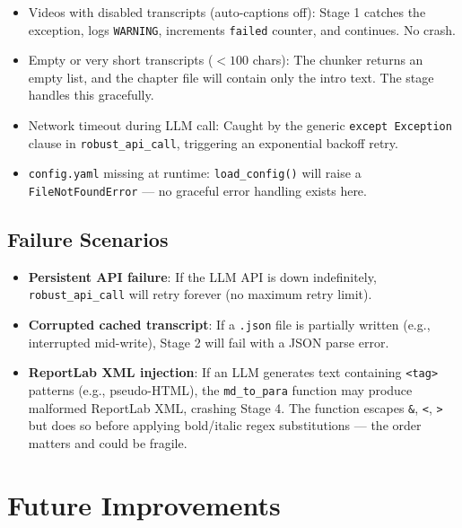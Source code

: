 \documentclass[11pt,a4paper]{article}
\begin{document}
\begin{itemize}[leftmargin=1.5em]
    \item Videos with disabled transcripts (auto-captions off): Stage 1 catches the exception, logs \texttt{WARNING}, increments \texttt{failed} counter, and continues. No crash.
    \item Empty or very short transcripts ($< 100$ chars): The chunker returns an empty list, and the chapter file will contain only the intro text. The stage handles this gracefully.
    \item Network timeout during LLM call: Caught by the generic \texttt{except Exception} clause in \texttt{robust\_api\_call}, triggering an exponential backoff retry.
    \item \texttt{config.yaml} missing at runtime: \texttt{load\_config()} will raise a \texttt{FileNotFoundError} --- no graceful error handling exists here.
\end{itemize}

\subsection{Failure Scenarios}

\begin{itemize}[leftmargin=1.5em]
    \item \textbf{Persistent API failure}: If the LLM API is down indefinitely, \texttt{robust\_api\_call} will retry forever (no maximum retry limit).
    \item \textbf{Corrupted cached transcript}: If a \texttt{.json} file is partially written (e.g., interrupted mid-write), Stage 2 will fail with a JSON parse error.
    \item \textbf{ReportLab XML injection}: If an LLM generates text containing \texttt{<tag>} patterns (e.g., pseudo-HTML), the \texttt{md\_to\_para} function may produce malformed ReportLab XML, crashing Stage 4. The function escapes \texttt{\&}, \texttt{<}, \texttt{>} but does so before applying bold/italic regex substitutions --- the order matters and could be fragile.
\end{itemize}

\section{Future Improvements}
\end{document}
